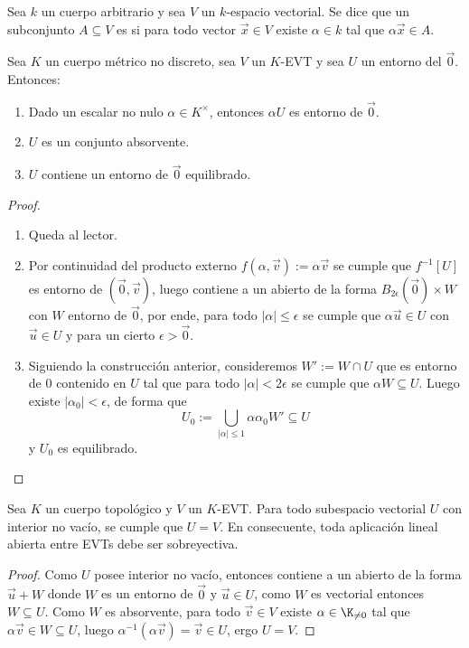 \documentclass[topologia-analisis.tex]{subfiles}
\begin{document}
\begin{mydef}
	Sea $k$ un cuerpo arbitrario y sea $V$ un $k$-espacio vectorial.
	Se dice que un subconjunto $A \subseteq V$ es  si para todo vector $\vec x \in V$
	existe $\alpha \in k$ tal que $\alpha\vec x \in A$.
\end{mydef}
\begin{prop}
	Sea $K$ un cuerpo métrico no discreto, sea $V$ un $K$-EVT y sea $U$ un entorno del $\Vec 0$.
	Entonces:
	\begin{enumerate}
		\item Dado un escalar no nulo $\alpha\in K^\times$, entonces $\alpha U$ es entorno de $\Vec 0$.
		\item $U$ es un conjunto absorvente.
		\item $U$ contiene un entorno de $\Vec 0$ equilibrado.
	\end{enumerate}
\end{prop}
\begin{proof}
	\begin{enumerate}
		\item Queda al lector.
		\item Por continuidad del producto externo $f(\alpha, \vec v) := \alpha \vec v$ se cumple que $f^{-1}[U]$ es entorno de $(\Vec 0, \vec v)$, luego contiene a un abierto de la forma $B_{2\epsilon}(\Vec 0)\times W$ con $W$ entorno de $\Vec 0$, por ende, para todo $|\alpha| \le \epsilon$ se cumple que $\alpha\vec u\in U$ con $\vec u\in U$ y para un cierto $\epsilon > \Vec 0$.
		\item Siguiendo la construcción anterior, consideremos $W' := W\cap U$ que es entorno de $0$ contenido en $U$ tal que para todo $|\alpha| < 2\epsilon$ se cumple que $\alpha W \subseteq U$.
			Luego existe $|\alpha_0| < \epsilon$, de forma que
			$$ U_0 := \bigcup_{|\alpha| \le 1} \alpha\alpha_0 W' \subseteq U $$
			y $U_0$ es equilibrado. \qedhere
	\end{enumerate}
\end{proof}

\begin{thm}
	Sea $K$ un cuerpo topológico y $V$ un $K$-EVT.
	Para todo subespacio vectorial $U$ con interior no vacío, se cumple que $U=V$.
	En consecuente, toda aplicación lineal abierta entre EVTs debe ser sobreyectiva.
\end{thm}
\begin{proof}
	Como $U$ posee interior no vacío, entonces contiene a un abierto de la forma $\vec u + W$ donde $W$ es un entorno de $\Vec 0$ y $\vec u\in U$,
	como $W$ es vectorial entonces $W\subseteq U$.
	Como $W$ es absorvente, para todo $\vec v\in V$ existe $\alpha\in\K_{\ne 0}$ tal que $\alpha\vec v\in W\subseteq U$, luego
	$\alpha^{-1}(\alpha\vec v) = \vec v \in U$, ergo $U = V$.
\end{proof}
\end{document}
